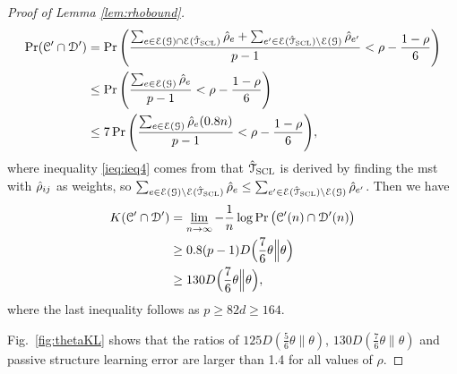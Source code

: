 \begin{proof}[Proof of Lemma \ref{lem:rhobound}]
	\begin{align}
		\Pr( \mathcal{C}^{\prime}\cap \mathcal{D}^{\prime})&=\Pr\Bigg(\frac{\sum_{e\in\mathcal{E}(\mathcal{G})\cap\mathcal{E}( \hat{\mathcal{T}}_{\rm{SCL}})}\hat{\rho}_{e}+\sum_{e^{\prime}\in\mathcal{E}( \hat{\mathcal{T}}_{\rm{SCL}})\backslash\mathcal{E}(\mathcal{G})}\hat{\rho}_{e^{\prime}}}{p-1}<\rho-\frac{1-\rho}{6}\Bigg)\\
		&\leq\Pr\Bigg(\frac{\sum_{e\in\mathcal{E}(\mathcal{G})}\hat{\rho}_{e}}{p-1}<\rho-\frac{1-\rho}{6}\Bigg)\label{ieq:ieq4}\\
		&\leq 7\Pr\Bigg(\frac{\sum_{e\in\mathcal{E}(\mathcal{G})}\hat{\rho}_{e}(0.8n)}{p-1}<\rho-\frac{1-\rho}{6}\Bigg),
	\end{align}
	where inequality \eqref{ieq:ieq4} comes from that $ \hat{\mathcal{T}}_{\rm{SCL}}$ is derived by finding the \ac{mst} with $\hat{\rho}_{ij}$ as weights, so $\sum_{e\in\mathcal{E}(\mathcal{G})\backslash\mathcal{E}( \hat{\mathcal{T}}_{\rm{SCL}})}\hat{\rho}_{e}\leq\sum_{e^{\prime}\in\mathcal{E}( \hat{\mathcal{T}}_{\rm{SCL}})\backslash\mathcal{E}(\mathcal{G})}\hat{\rho}_{e^{\prime}}$. 
	Then we have
	\begin{align}
		K (\mathcal{C}^{\prime}\cap \mathcal{D}^{\prime})&=\varliminf_{n\rightarrow\infty}-\frac{1}{n}\log\Pr\big( \mathcal{C}^{\prime}(n)\cap \mathcal{D}^{\prime}(n)\big)\\
		&\geq 0.8(p-1)D\Big(\frac{7}{6}\theta\Big\|\theta\Big)\\
		&\geq 130 D\Big(\frac{7}{6}\theta\Big\|\theta\Big),
	\end{align}
	where the last inequality follows as $p\geq 82d\geq 164.$

	Fig.~\ref{fig:thetaKL} shows that the ratios of $125D(\frac{5}{6}\theta\|\theta)$, $130D(\frac{7}{6}\theta\|\theta)$ and passive structure learning error are larger than 1.4 for all  values of $\rho$.
\end{proof}

